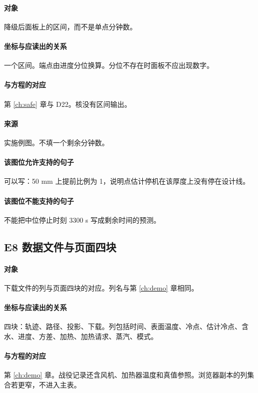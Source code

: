 \paragraph{对象}
降级后面板上的区间，而不是单点分钟数。

\paragraph{坐标与应读出的关系}
一个区间。端点由进度分位换算。分位不存在时面板不应出现数字。

\paragraph{与方程的对应}
第 \ref{ch:safe} 章与 D22。核没有区间输出。

\paragraph{来源}
实施例图。不填一个剩余分钟数。

\paragraph{该图位允许支持的句子}
可以写：50 mm 上提前比例为 1，说明点估计停机在该厚度上没有停在设计线。

\paragraph{该图位不能支持的句子}
不能把中位停止时刻 3300 s 写成剩余时间的预测。

\subsection{E8 数据文件与页面四块}
\paragraph{对象}
下载文件的列与页面四块的对应。列名与第 \ref{ch:demo} 章相同。

\paragraph{坐标与应读出的关系}
四块：轨迹、路径、投影、下载。列包括时间、表面温度、冷点、估计冷点、含水、进度、方差、加热、加热请求、蒸汽、模式。

\paragraph{与方程的对应}
第 \ref{ch:demo} 章。战役记录还含风机、加热器温度和真值参照。浏览器副本的列集合若更窄，不进入主表。

